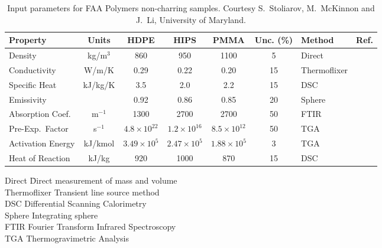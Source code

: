 \begin{table}[h!]
\caption[FAA non-charring polymer properties.]{Input parameters for FAA Polymers non-charring samples. Courtesy S.~Stoliarov, M.~McKinnon and J.~Li, University of Maryland.}
\begin{tabular}{|l|c|c|c|c|c|l|l|}
\hline
Property                    & Units         & HDPE                  & HIPS                  & PMMA                  & Unc. (\%)  & Method                &  Ref.                    \\ \hline \hline
Density                     & kg/m$^3$      & 860                   & 950                   & 1100                   & 5     & Direct                &  \cite{Stoliarov:CF2009}  \\ \hline
Conductivity                & W/m/K         & 0.29                  & 0.22                  & 0.20                 & 15    & Thermoflixer          &  \cite{Stoliarov:CF2009}  \\ \hline
Specific Heat               & kJ/kg/K       & 3.5                   & 2.0                   & 2.2                    & 15    & DSC                   &  \cite{Stoliarov:PDS2008}  \\ \hline
Emissivity                  &               & 0.92                  & 0.86                  & 0.85                  & 20    & Sphere                &  \cite{Hallman:PES1974}  \\ \hline
Absorption Coef.            & m$^{-1}$      & 1300                  & 2700                  & 2700                  & 50    & FTIR                  &  \cite{Tsilingiris:ECM2003}  \\ \hline
Pre-Exp.~Factor             & s$^{-1}$      & $4.8 \times 10^{22}$  & $1.2 \times 10^{16}$  & $8.5 \times 10^{12}$    & 50    & TGA                   &  \cite{Stoliarov:CF2009}  \\ \hline
Activation Energy           & kJ/kmol       & $3.49 \times 10^{5}$  & $2.47 \times 10^{5}$  & $1.88 \times 10^{5}$  & 3     & TGA                   &  \cite{Stoliarov:CF2009}  \\ \hline
Heat of Reaction            & kJ/kg         & 920                   & 1000                  & 870                 & 15    & DSC                   &  \cite{Stoliarov:PDS2008}  \\ \hline
\end{tabular}
\label{FAA_Properties}
\end{table}

\begin{tabbing}
Direct  \hspace{0.5in}     \= Direct measurement of mass and volume \\
Thermoflixer               \> Transient line source method \\
DSC                        \> Differential Scanning Calorimetry \\
Sphere                     \> Integrating sphere \\
FTIR                       \> Fourier Transform Infrared Spectroscopy \\
TGA                        \> Thermogravimetric Analysis
\end{tabbing}


